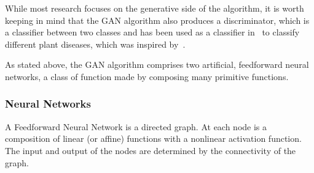 While most research focuses on the generative side of the algorithm, it is worth
keeping in mind that the GAN algorithm also produces a discriminator, which is a
classifier between two classes and has been used as a classifier
in~\cite{ref:cortes-2017} to classify different plant diseases, which was
inspired by~\cite{ref:odena-2016}.

As stated above, the GAN algorithm comprises two artificial, feedforward neural
networks, a class of function made by composing many primitive functions.

\subsubsection*{Neural Networks}

\begin{definition}
  A \textnormal{\sffamily Feedforward Neural Network} is a directed graph. At
  each node is a composition of linear (or affine) functions with a nonlinear
  activation function. The input and output of the nodes are determined by the
  connectivity of the graph.
\end{definition}

